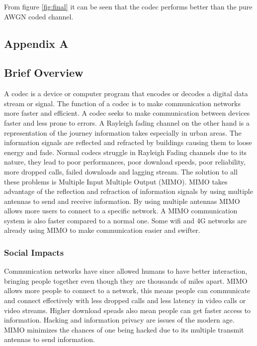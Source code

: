 \documentclass[11pt]{report}
\begin{document}
From figure \ref{fig:final} it can be seen that the codec performs better than the pure AWGN coded channel.




\newpage
\begin{appendices}
	
	\section*{Appendix A}
	
	\subsection*{Brief Overview}
	A codec is a device or computer program that encodes or decodes a digital data stream or signal. The function of a codec is to make communication networks more faster and efficient. A codec seeks to make communication between devices faster and less prone to errors. A Rayleigh fading channel on the other hand is a representation of the journey information takes especially in urban areas. The information signals are reflected and refracted by buildings causing them to loose energy and fade. Normal codecs struggle in Rayleigh Fading channels due to its nature, they lead to poor performances, poor download speeds,  poor reliability, more dropped calls, failed downloads and lagging stream. The solution to all these problems is Multiple Input Multiple Output (MIMO). MIMO takes advantage of the reflection and refraction of information signals by using multiple antennas to send and receive information. By using multiple antennas MIMO allows more users to connect to a specific network. A MIMO communication system is also faster compared to a normal one. Some wifi and 4G networks are already using MIMO to make communication easier and swifter.
	
	
	\subsubsection*{Social Impacts}
	Communication networks have since allowed humans to have better interaction, bringing people together even though they are thousands of miles apart. MIMO allows more people to connect to a network, this means people can communicate and connect effectively with less dropped calls and less latency in video calls or video streams. Higher download speads also mean people can get faster access to information. Hacking and information privacy are issues of the modern age. MIMO minimizes the chances of one being hacked due to its multiple transmit antennas to send information.
	

\end{appendices}
\end{document}
